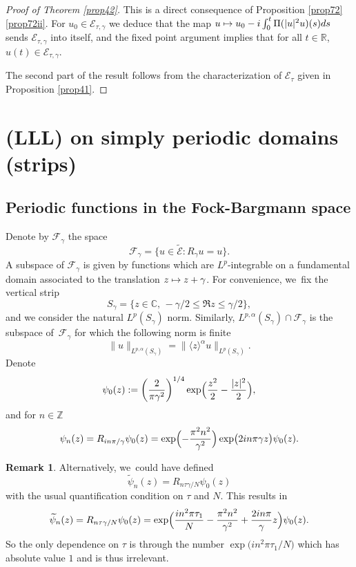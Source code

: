 \documentclass[10pt]{amsart}
\newcommand\mto{\mathchoice{\longmapsto}{\mapsto}{\mapsto}{\mapsto}}
\let\sep:
\theoremstyle{definition}
\newtheorem{remark}[theorem]{Remark}
\let\EE\exp
\let\dis\relax
\let\wt\widetilde
\newcommand\R{\mathbb R}
\newcommand\Z{\mathbb Z}
\begin{document}
\begin{proof}[Proof of Theorem \ref{prop42}]
This is a direct consequence of Proposition \ref{prop72}\eqref{prop72ii}. For $u_{0}\in \mathcal{E}_{\tau, \gamma}$ we deduce that the map $\dis u\mto u_{0}-i\int_{0}^{t} \Pi(\vert u\vert^2u)(s)ds$ sends $\mathcal{E}_{\tau, \gamma}$ into itself, and the fixed point argument implies that for all $t\in \R$, $u(t)\in \mathcal{E}_{\tau, \gamma}$.

The second part of the result follows from the characterization of $\mathcal{E}_{\tau}$ given in Proposition \ref{prop41}.
\end{proof}

\section{(LLL) on simply periodic domains (strips)}
\label{section3}

\subsection{Periodic functions in the Fock-Bargmann space}
Denote by $\mathcal{F}_{\gamma}$ the space
\begin{equation*}
\mathcal{F}_{\gamma}=\bigl\{u\in \widetilde{{\mathcal{E}}}\sep R_{\gamma}u=u\bigr\}.
\end{equation*}
A subspace of $\mathcal{F}_\gamma$ is given by functions which are $L^p$-integrable on a fundamental domain associated to the translation $z \mto z+\gamma$. For convenience, we~fix the vertical strip
\[
S_\gamma = \bigl\{ z \in \mathbb{C}, \, -{\gamma}/{2} \leq \Re z \leq {\gamma}/{2} \bigr\},
\]
and we consider the natural $L^p(S_\gamma)$ norm. Similarly, $L^{p,\alpha}(S_\gamma) \cap \mathcal{F}_{\gamma} $ is the subspace of~$\mathcal{F}_\gamma$ for which the following norm is finite
\[
\| u \|_{L^{p,\alpha}(S_\gamma)} = \| \langle z \rangle^\alpha u \|_{L^p(S_\gamma)}.
\]
Denote
\[
\psi_0(z):=\left(\frac{2}{\pi \gamma^2}\right)^{1/4}\EE\Bigl({\frac{z^2}2-\frac{|z|^2}2}\Bigr),
\]
and for $n\in \Z$
\begin{equation*}
\psi_n(z) = R_{{i n \pi}/ \gamma}\psi_0(z) = \EE\Bigl({-\frac{\pi^2 n^2}{\gamma^2}}\Bigr) \EE\bigl({{2in\pi}{\gamma} z}\bigr)\psi_0(z).
\end{equation*}

\begin{remark}
Alternatively, we~could have defined
\[
\wt{\psi}_n(z) =R_{{n\tau \gamma}/ N}\psi_0(z)
\]
with the usual quantification condition on $\tau$ and $N$. This results in
\[
\wt{\psi}_n(z) =R_{{n\tau \gamma}/ N}\psi_0(z)= \EE\Bigl(\frac{i n^2 \pi \tau_1}{N} -\frac{\pi^2 n^2}{\gamma^2}+ \frac{2in\pi}{\gamma} z\Bigr) \psi_0(z).
\]
So the only dependence on $\tau$ is through the number $\EE\bigl({i {n^2 \pi \tau_1}/ {N}}\bigr)$ which has absolute value $1$ and is thus irrelevant.
\end{remark}
\end{document}
